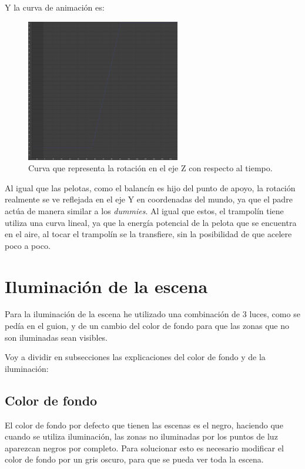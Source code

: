 \documentclass{article}
\begin{document}
Y la curva de animación es:

\begin{figure}[H]
    \centering
    \includegraphics[width=0.6\textwidth]{imagenes/curvas/Trampolin/blue.png}
    \caption{Curva que representa la rotación en el eje Z con respecto al tiempo.}
 \end{figure}

 Al igual que las pelotas, como el balancín es hijo del punto de apoyo, la rotación realmente se ve reflejada en el eje Y en coordenadas del mundo, ya que el padre actúa de manera similar a los \textit{dummies}. Al igual que estos, el trampolín tiene utiliza una curva lineal, ya que la energía potencial de la pelota que se encuentra en el aire, al tocar el trampolín se la transfiere, sin la posibilidad de que acelere poco a poco.
\section{Iluminación de la escena}
Para la iluminación de la escena he utilizado una combinación de 3 luces, como se pedía en el guion, y de un cambio del color de fondo para que las zonas que no son iluminadas sean visibles.

\bigskip

Voy a dividir en subsecciones las explicaciones del color de fondo y de la iluminación:

\subsection{Color de fondo}

El color de fondo por defecto que tienen las escenas es el negro, haciendo que cuando se utiliza iluminación, las zonas no iluminadas por los puntos de luz aparezcan negros por completo. Para solucionar esto es necesario modificar el color de fondo por un gris oscuro, para que se pueda ver toda la escena.
\end{document}
